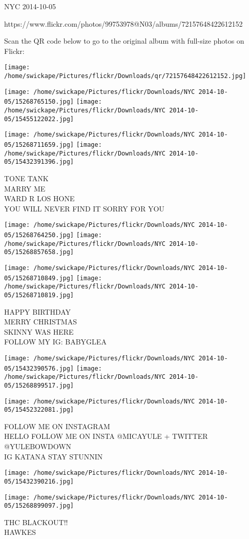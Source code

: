 \documentclass[10pt,letterpaper]{article}
\begin{document}
NYC 2014-10-05

https://www.flickr.com/photos/99753978@N03/albums/72157648422612152

Scan the QR code below to go to the original album with full-size photos on Flickr:

\texttt{[image: /home/swickape/Pictures/flickr/Downloads/qr/72157648422612152.jpg]}
\pagebreak

\texttt{[image: /home/swickape/Pictures/flickr/Downloads/NYC 2014-10-05/15268765150.jpg]}
\texttt{[image: /home/swickape/Pictures/flickr/Downloads/NYC 2014-10-05/15455122022.jpg]}

\texttt{[image: /home/swickape/Pictures/flickr/Downloads/NYC 2014-10-05/15268711659.jpg]}
\texttt{[image: /home/swickape/Pictures/flickr/Downloads/NYC 2014-10-05/15432391396.jpg]}

TONE TANK\\
MARRY ME\\
WARD R LOS HONE\\
YOU WILL NEVER FIND IT SORRY FOR YOU
\pagebreak

\texttt{[image: /home/swickape/Pictures/flickr/Downloads/NYC 2014-10-05/15268764250.jpg]}
\texttt{[image: /home/swickape/Pictures/flickr/Downloads/NYC 2014-10-05/15268857658.jpg]}

\texttt{[image: /home/swickape/Pictures/flickr/Downloads/NYC 2014-10-05/15268710849.jpg]}
\texttt{[image: /home/swickape/Pictures/flickr/Downloads/NYC 2014-10-05/15268710819.jpg]}

HAPPY BIRTHDAY\\
MERRY CHRISTMAS\\
SKINNY WAS HERE\\
FOLLOW MY IG: BABYGLEA
\pagebreak

\texttt{[image: /home/swickape/Pictures/flickr/Downloads/NYC 2014-10-05/15432390576.jpg]}
\texttt{[image: /home/swickape/Pictures/flickr/Downloads/NYC 2014-10-05/15268899517.jpg]}

\vspace{0.25in}
\texttt{[image: /home/swickape/Pictures/flickr/Downloads/NYC 2014-10-05/15452322081.jpg]}

FOLLOW ME ON INSTAGRAM\\
HELLO FOLLOW ME ON INSTA @MICAYULE + TWITTER @YULEBOWDOWN\\
IG KATANA STAY STUNNIN
\pagebreak

\texttt{[image: /home/swickape/Pictures/flickr/Downloads/NYC 2014-10-05/15432390216.jpg]}

\vspace{0.25in}
\texttt{[image: /home/swickape/Pictures/flickr/Downloads/NYC 2014-10-05/15268899097.jpg]}

THC BLACKOUT!!\\
HAWKES
\pagebreak
\end{document}

